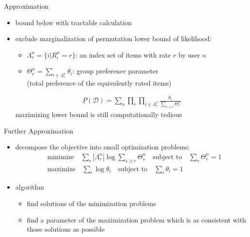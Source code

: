 \documentclass[fleqn,aspectratio=1610]{beamer}
\begin{document}
\begin{frame}[label={sec:orgd069a0a}]{Approximation}
\begin{itemize}
\item bound below with tractable calculation
\item exclude marginalization of permutation
lower bound of likelihood:
\begin{itemize}
\item \(\Lambda_r^n=\{i|R_i^n=r\}\): an index set of items with rate \(r\)
by user \(n\)
\item \(\Theta_r^n=\sum_{i\in \Lambda_r^n}\theta_i\): group preference
parameter\\[0pt]
(total preference of the equivalently rated items)
\end{itemize}
\begin{align}
  \underline{P}(\mathcal{D})
  =\sum_{n}\prod_{r}\prod_{i\in \Lambda_r^n}
  \frac{\theta_i}{\sum_{s\le r}\Theta_s^n}
\end{align}
\alert{maximizing lower bound is still computationally tedious}
\end{itemize}
\end{frame}

\begin{frame}[label={sec:org607cc6c}]{Further Approximation}
\begin{itemize}
\item decompose the objective into small optimization problems: 
\begin{align}
  &\text{minimize}\quad\sum_r|\Lambda_r^n|\log\sum_{s\ge r}\Theta_s^n
    \quad\text{subject to}\quad\sum_r\Theta_r^n=1\\
  &\text{maximize}\quad\sum_i\log\theta_i
    \quad\text{subject to}\quad\sum_i\theta_i=1
\end{align}
\item algorithm
\begin{itemize}
\item find solutions of the minimization problems
\item find a parameter of the maximization problem 
which is as consistent with those solutions as possible
\end{itemize}
\end{itemize}
\end{frame}
\end{document}
